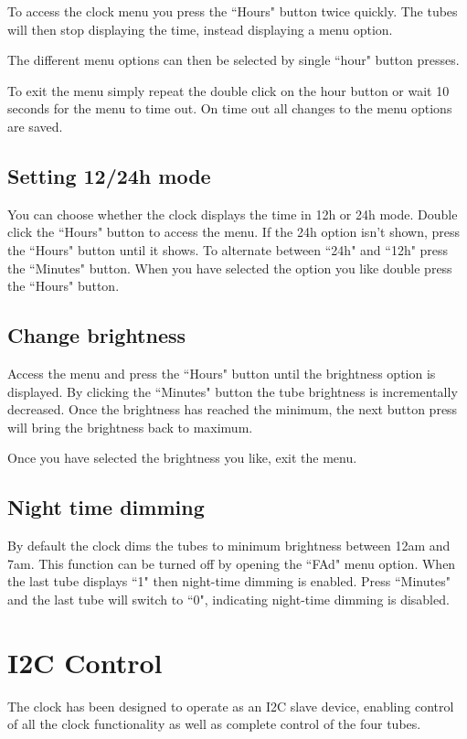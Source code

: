 \documentclass[12pt]{article}
\begin{document}
To access the clock menu you press the ``Hours" button twice quickly. The tubes will then stop displaying the time, instead displaying a menu option.

The different menu options can then be selected by single ``hour" button presses.

To exit the menu simply repeat the double click on the hour button or wait 10 seconds for the menu to time out. On time out all changes to the menu options are saved.

\subsection{Setting 12/24h mode}
You can choose whether the clock displays the time in 12h or 24h mode. Double click the ``Hours" button to access the menu. If the 24h option isn't shown, press the ``Hours" button until it shows. To alternate between ``24h" and ``12h" press the ``Minutes" button. When you have selected the option you like double press the ``Hours" button.

\subsection{Change brightness}
Access the menu and press the ``Hours" button until the brightness option is displayed. By clicking the ``Minutes" button the tube brightness is incrementally decreased. Once the brightness has reached the minimum, the next button press will bring the brightness back to maximum. 

Once you have selected the brightness you like, exit the menu.

\subsection{Night time dimming}
By default the clock dims the tubes to minimum brightness between 12am and 7am. This function can be turned off by opening the ``FAd" menu option. When the last tube displays ``1" then night-time dimming is enabled. Press ``Minutes" and the last tube will switch to ``0", indicating night-time dimming is disabled.

\renewcommand{\figurename}{Fig}

\section{I2C Control}
The clock has been designed to operate as an I2C slave device, enabling control of all the clock functionality as well as complete control of the four tubes. 
\end{document}
